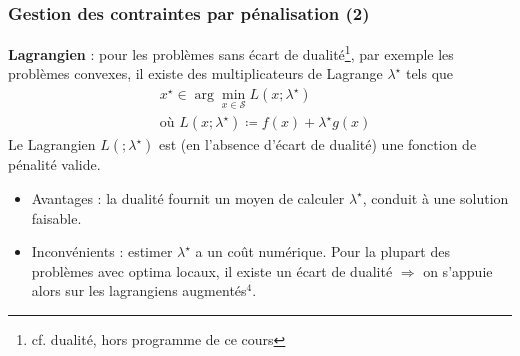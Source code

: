 \documentclass[12pt]{beamer}
\begin{document}
\begin{frame}
\frametitle{Gestion des contraintes par pénalisation (2)} 
\textbf{Lagrangien} : pour les problèmes sans écart de dualité\footnote{cf. dualité, hors programme de ce cours}, par exemple les problèmes convexes, il existe des multiplicateurs de Lagrange $\lambda^\star$ tels que 
\begin{equation*}
\begin{split}
& x^\star \in \arg \min_{x \in \mathcal S} L(x;\lambda^\star) \\
&\text{où } L(x;\lambda^\star) \coloneqq f(x) + \lambda^\star g(x)
\end{split}
\end{equation*}
Le Lagrangien $L(;\lambda^\star)$ est (en l’absence d’écart de dualité) une fonction de pénalité valide.
\begin{itemize}
\item{Avantages} : la dualité fournit un moyen de calculer $\lambda^\star$, conduit à une solution faisable.
\item{Inconvénients} : estimer $\lambda^\star$ a un coût numérique. 
Pour la plupart des problèmes avec optima locaux, il existe un écart de dualité $\Rightarrow$ on s’appuie alors sur les lagrangiens augmentés$^4$.
\end{itemize}
\end{frame}
\end{document}
